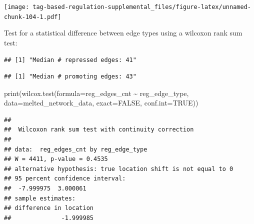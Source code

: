 \documentclass[
]{book}
\newenvironment{Shaded}{\begin{snugshade}}{\end{snugshade}}
\newcommand{\AttributeTok}[1]{\textcolor[rgb]{0.77,0.63,0.00}{#1}}
\newcommand{\ConstantTok}[1]{\textcolor[rgb]{0.00,0.00,0.00}{#1}}
\newcommand{\FunctionTok}[1]{\textcolor[rgb]{0.00,0.00,0.00}{#1}}
\newcommand{\NormalTok}[1]{#1}
\newcommand{\SpecialCharTok}[1]{\textcolor[rgb]{0.00,0.00,0.00}{#1}}
\newcommand{\StringTok}[1]{\textcolor[rgb]{0.31,0.60,0.02}{#1}}
\begin{document}
\texttt{[image: tag-based-regulation-supplemental\_files/figure-latex/unnamed-chunk-104-1.pdf]}

Test for a statistical difference between edge types using a wilcoxon rank sum test:

\begin{Shaded}
\end{Shaded}

\begin{verbatim}
## [1] "Median # repressed edges: 41"
\end{verbatim}

\begin{Shaded}
\end{Shaded}

\begin{verbatim}
## [1] "Median # promoting edges: 43"
\end{verbatim}

\begin{Shaded}
\begin{Highlighting}[]
\FunctionTok{print}\NormalTok{(}\FunctionTok{wilcox.test}\NormalTok{(}\AttributeTok{formula=}\NormalTok{reg\_edges\_cnt }\SpecialCharTok{\textasciitilde{}}\NormalTok{ reg\_edge\_type, }\AttributeTok{data=}\NormalTok{melted\_network\_data, }\AttributeTok{exact=}\ConstantTok{FALSE}\NormalTok{, }\AttributeTok{conf.int=}\ConstantTok{TRUE}\NormalTok{))}
\end{Highlighting}
\end{Shaded}

\begin{verbatim}
## 
##  Wilcoxon rank sum test with continuity correction
## 
## data:  reg_edges_cnt by reg_edge_type
## W = 4411, p-value = 0.4535
## alternative hypothesis: true location shift is not equal to 0
## 95 percent confidence interval:
##  -7.999975  3.000061
## sample estimates:
## difference in location 
##              -1.999985
\end{verbatim}
\end{document}

